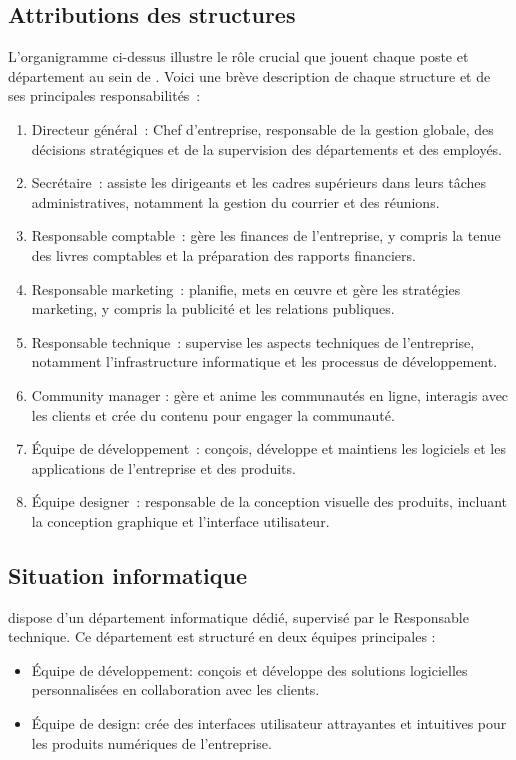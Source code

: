\subsection{Attributions des structures}
L’organigramme ci-dessus illustre le rôle crucial que jouent chaque poste et
département au sein de \firm. Voici une brève description de chaque
structure et de ses principales responsabilités :
\begin{enumerate}
  \item Directeur général : Chef d’entreprise, responsable de la gestion globale,
    des décisions stratégiques et de la supervision des départements et des employés.

  \item Secrétaire : assiste les dirigeants et les cadres supérieurs dans leurs
    tâches administratives, notamment la gestion du courrier et des réunions.

  \item Responsable comptable : gère les finances de l’entreprise, y compris la
    tenue des livres comptables et la préparation des rapports financiers.

  \item Responsable marketing : planifie, mets en œuvre et gère les stratégies
    marketing, y compris la publicité et les relations publiques.

  \item Responsable technique : supervise les aspects techniques de l’entreprise,
    notamment l’infrastructure informatique et les processus de développement.

  \item Community manager : gère et anime les communautés en ligne, interagis
    avec les clients et crée du contenu pour engager la communauté.

  \item Équipe de développement : conçois, développe et maintiens les logiciels
    et les applications de l’entreprise et des produits.

  \item Équipe designer : responsable de la conception visuelle des produits,
    incluant la conception graphique et l’interface utilisateur.

\end{enumerate}

\subsection{Situation informatique}
\firm dispose d’un département informatique dédié, supervisé par le Responsable
technique. Ce département est structuré en deux équipes principales :
\begin{itemize}

  \item Équipe de développement: conçois et développe des solutions logicielles
    personnalisées en collaboration avec les clients.
  \item Équipe de design: crée des interfaces utilisateur attrayantes et intuitives
    pour les produits numériques de l’entreprise.
\end{itemize}

